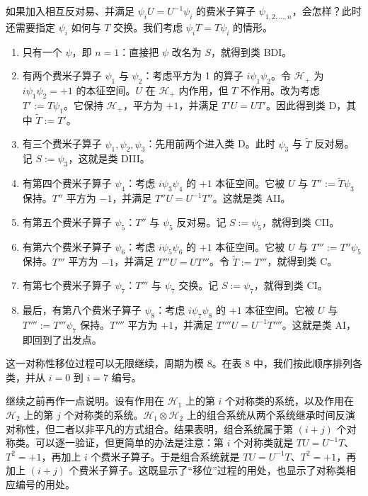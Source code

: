 如果加入相互反对易、并满足 $\psi_iU=U^{-1}\psi_i$ 的费米子算子 $\psi_{1,2,\ldots,n}$，会怎样？此时还需要指定 $\psi_i$ 如何与 $T$ 交换。我们考虑 $\psi_iT=T\psi_i$ 的情形。
\begin{enumerate}
  \item 只有一个 $\psi$，即 $n=1$：直接把 $\psi$ 改名为 $S$，就得到类 BDI。
  \item 有两个费米子算子 $\psi_1$ 与 $\psi_2$：考虑平方为 1 的算子 $i\psi_1\psi_2$。令 $\mathcal{H}_+$ 为 $i\psi_1\psi_2=+1$ 的本征空间。$U$ 在 $\mathcal{H}_+$ 内作用，但 $T$ 不作用。改为考虑 $T':=T\psi_1$。它保持 $\mathcal{H}_+$，平方为 $+1$，并满足 $T'U=UT'$。因此得到类 D，其中 $\tilde T:=T'$。
  \item 有三个费米子算子 $\psi_1,\psi_2,\psi_3$：先用前两个进入类 D。此时 $\psi_3$ 与 $\tilde T$ 反对易。记 $S:=\psi_3$，这就是类 DIII。
  \item 有第四个费米子算子 $\psi_4$：考虑 $i\psi_3\psi_4$ 的 $+1$ 本征空间。它被 $U$ 与 $T'':=\tilde T\psi_3$ 保持。$T''$ 平方为 $-1$，并满足 $T''U=U^{-1}T''$。这就是类 AII。
  \item 有第五个费米子算子 $\psi_5$：$T''$ 与 $\psi_5$ 反对易。记 $S:=\psi_5$，就得到类 CII。
  \item 有第六个费米子算子 $\psi_6$：考虑 $i\psi_5\psi_6$ 的 $+1$ 本征空间。它被 $U$ 与 $T''':=T''\psi_5$ 保持。$T'''$ 平方为 $-1$，并满足 $T'''U=UT'''$。令 $\tilde T:=T'''$，就得到类 C。
  \item 有第七个费米子算子 $\psi_7$：$T'''$ 与 $\psi_7$ 交换。记 $S:=\psi_7$，就得到类 CI。
  \item 最后，有第八个费米子算子 $\psi_8$：考虑 $i\psi_7\psi_8$ 的 $+1$ 本征空间。它被 $U$ 与 $T'''':=T'''\psi_7$ 保持。$T''''$ 平方为 $+1$，并满足 $T''''U=U^{-1}T''''$。这就是类 AI，即回到了出发点。
\end{enumerate}
这一对称性移位过程可以无限继续，周期为模 8。在表 8 中，我们按此顺序排列各类，并从 $i=0$ 到 $i=7$ 编号。%

继续之前再作一点说明。设有作用在 $\mathcal{H}_1$ 上的第 $i$ 个对称类的系统，以及作用在 $\mathcal{H}_2$ 上的第 $j$ 个对称类的系统。$\mathcal{H}_1\otimes\mathcal{H}_2$ 上的组合系统从两个系统继承时间反演对称性，但二者以非平凡的方式组合。结果表明，组合系统属于第 $(i+j)$ 个对称类。可以逐一验证，但更简单的办法是注意：第 $i$ 个对称类就是 $TU=U^{-1}T$、$T^2=+1$，再加上 $i$ 个费米子算子。于是组合系统就是 $TU=U^{-1}T$、$T^2=+1$，再加上 $(i+j)$ 个费米子算子。这既显示了“移位”过程的用处，也显示了对称类相应编号的用处。

